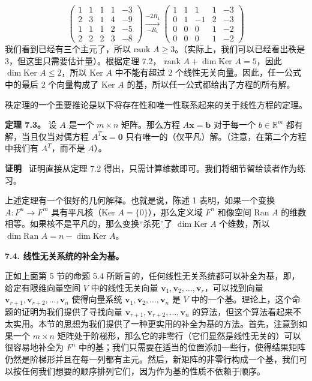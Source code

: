 $$
\begin{pmatrix} 1 & 1 & 1 & 1 & -3 \\ 2 & 3 & 1 & 4 & -9 \\ 1 & 1 & 1 & 2 & -5 \\ 2 & 2 & 2 & 3 & -8 \end{pmatrix} \xrightarrow[{-R_1}]{-2R_1} \begin{pmatrix} 1 & 1 & 1 & 1 & -3 \\ 0 & 1 & -1 & 2 & -3 \\ 0 & 0 & 0 & 1 & -2 \\ 0 & 0 & 0 & 1 & -2 \end{pmatrix}
$$
我们看到已经有三个主元了，所以 $\text{rank } A \ge 3$。（实际上，我们可以已经看出秩是 3，但这里只需要估计量）。根据定理 7.2， $\text{rank } A + \dim \text{Ker } A = 5$，因此 $\dim \text{Ker } A \le 2$，所以 $\text{Ker } A$ 中不能有超过 2 个线性无关向量。因此，任一公式中的最后 2 个向量构成了 $\text{Ker } A$ 的基，所以任一公式都给出了方程的所有解。

秩定理的一个重要推论是以下将存在性和唯一性联系起来的关于线性方程的定理。

\textbf{定理 7.3。} 设 $A$ 是一个 $m \times n$ 矩阵。那么方程 $A \mathbf{x} = \mathbf{b}$ 对于每一个 $b \in \mathbb{R}^m$ 都有解，当且仅当对偶方程 $A^T \mathbf{x} = \mathbf{0}$ 只有唯一的（仅平凡）解。（注意，在第二个方程中我们有 $A^T$，而不是 $A$）。

\textbf{证明}~ 证明直接从定理 7.2 得出，只需计算维数即可。我们将细节留给读者作为练习。

上述定理有一个很好的几何解释。也就是说，陈述 1 表明，如果一个变换 $A: F^n \to F^m$ 具有平凡核（Ker $A = \{0\}$），那么定义域 $F^n$ 和像空间 $\text{Ran } A$ 的维数相等。如果核不是平凡的，那么变换“杀死”了 $\dim \text{Ker } A$ 个维数，所以 $\dim \text{Ran } A = n - \dim \text{Ker } A$。

\textbf{7.4. 线性无关系统的补全为基。}

正如上面第 5 节的命题 5.4 所断言的，任何线性无关系统都可以补全为基，即，给定有限维向量空间 $V$ 中的线性无关向量 $\mathbf{v}_1, \mathbf{v}_2, \dots, \mathbf{v}_r$，可以找到向量 $\mathbf{v}_{r+1}, \mathbf{v}_{r+2}, \dots, \mathbf{v}_n$ 使得向量系统 $\mathbf{v}_1, \mathbf{v}_2, \dots, \mathbf{v}_n$ 是 $V$ 中的一个基。理论上，这个命题的证明为我们提供了寻找向量 $\mathbf{v}_{r+1}, \mathbf{v}_{r+2}, \dots, \mathbf{v}_n$ 的算法，但这个算法看起来不太实用。本节的思想为我们提供了一种更实用的补全为基的方法。首先，注意到如果一个 $m \times n$ 矩阵处于阶梯形，那么它的非零行（它们显然是线性无关的）可以很容易地补全为 $F^n$ 中的基；我们只需要在适当的位置添加一些行，使得结果矩阵仍然是阶梯形并且在每一列都有主元。然后，新矩阵的非零行构成一个基，我们可以按任何我们想要的顺序排列它们，因为作为基的性质不依赖于顺序。

